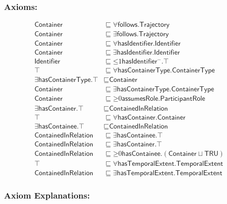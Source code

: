 \subsubsection*{Axioms:}

\begin{align}
    \textsf{Container} &\sqsubseteq \forall\textsf{follows.Trajectory}\\
    \textsf{Container} &\sqsubseteq \exists\textsf{follows.Trajectory}\\
    \textsf{Container} &\sqsubseteq \forall\textsf{hasIdentifier.Identifier}\\
    \textsf{Container} &\sqsubseteq \exists\textsf{hasIdentifier.Identifier}\\
    \textsf{Identifier} &\sqsubseteq \mathord{\leq} 1\textsf{hasIdentifier}\mathord{^-}.\top\\
    \top &\sqsubseteq \forall\textsf{hasContainerType.ContainerType}\\
    \exists\textsf{hasContainerType}.\top &\sqsubseteq \textsf{Container}\\
    \textsf{Container} &\sqsubseteq \exists\textsf{hasContainerType.ContainerType}\\
    \textsf{Container} &\sqsubseteq \mathord{\geq}0\textsf{assumesRole.ParticipantRole}\\
    \exists\textsf{hasContainer}.\top &\sqsubseteq \textsf{ContainedInRelation}\\
    \top &\sqsubseteq \forall\textsf{hasContainer.Container}\\
    \exists\textsf{hasContainee}.\top &\sqsubseteq \textsf{ContainedInRelation}\\
    \textsf{ContainedInRelation} &\sqsubseteq \exists\textsf{hasContainee}.\top\\
    \textsf{ContainedInRelation} &\sqsubseteq \exists\textsf{hasContainer}.\top\\
    \textsf{ContainedInRelation} &\sqsubseteq \mathord{\geq}0\textsf{hasContainee}.(\textsf{Container} \sqcup \textsf{TRU})\\
    \top &\sqsubseteq \forall\textsf{hasTemporalExtent.TemporalExtent}\\
    \textsf{ContainedInRelation} &\sqsubseteq \exists\textsf{hasTemporalExtent.TemporalExtent}
\end{align}

\subsubsection*{Axiom Explanations:}

